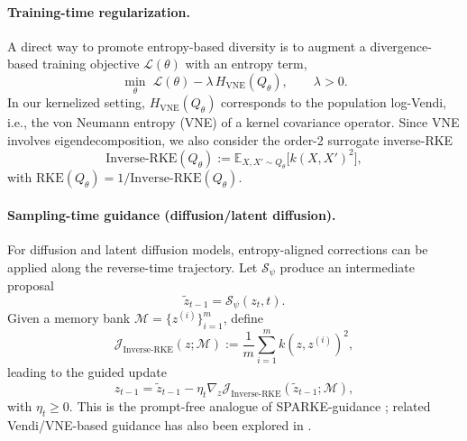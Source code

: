 \documentclass{article}
\theoremstyle{plain}
\theoremstyle{definition}
\begin{document}
\paragraph{Training-time regularization.}
A direct way to promote entropy-based diversity is to augment a divergence-based training objective $\mathcal{L}(\theta)$ with an entropy term,
\begin{equation}\label{eq:entropy_regularized_objective_final}
\min_\theta\; \mathcal{L}(\theta) - \lambda\, H_{\mathrm{VNE}}(Q_\theta),\qquad \lambda>0.
\end{equation}
In our kernelized setting, $H_{\mathrm{VNE}}(Q_\theta)$ corresponds to the population log-Vendi, i.e., the von Neumann entropy (VNE) of a kernel covariance operator. Since VNE involves eigendecomposition, we also consider the order-2 surrogate inverse-RKE \citep{jalali2023rke}
\begin{equation}\label{eq:irke_def_final}
\mathrm{Inverse\text{-}RKE}(Q_\theta)
:= \mathbb{E}_{X,X'\sim Q_\theta}\bigl[k(X,X')^2\bigr],
\end{equation}
with $\mathrm{RKE}(Q_\theta)=1/\mathrm{Inverse\text{-}RKE}(Q_\theta)$.

\paragraph{Sampling-time guidance (diffusion/latent diffusion).}
For diffusion and latent diffusion models, entropy-aligned corrections can be applied along the reverse-time trajectory. Let $\mathcal{S}_\psi$ produce an intermediate proposal
\begin{equation}\label{eq:generic_sampler_final}
\tilde z_{t-1} = \mathcal{S}_\psi(z_t,t).
\end{equation}
Given a memory bank $\mathcal{M}=\{z^{(i)}\}_{i=1}^m$, define
\begin{equation}\label{eq:irke_latent_final}
\mathcal{J}_{\mathrm{Inverse\text{-}RKE}}(z;\mathcal{M})
:= \frac{1}{m}\sum_{i=1}^m k(z,z^{(i)})^2,
\end{equation}
leading to the guided update
\begin{equation}\label{eq:diffusion_irke_guidance_final}
z_{t-1}
= \tilde z_{t-1}
- \eta_t \nabla_z \mathcal{J}_{\mathrm{Inverse\text{-}RKE}}(\tilde z_{t-1};\mathcal{M}),
\end{equation}
with $\eta_t\ge 0$. This is the prompt-free analogue of SPARKE-guidance \citep{jalali2025sparke}; related Vendi/VNE-based guidance has also been explored in \citep{hemmat2024cvsg}.
\end{document}
